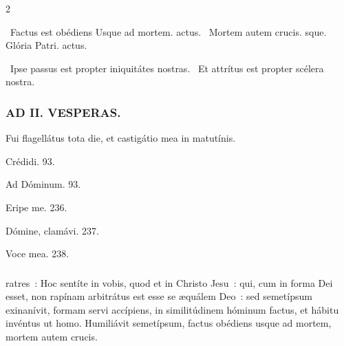 \documentclass[9pt,twoside]{extarticle}
\begin{document}
\begin{multicols}{2}
{\begin{tightlist}{}
\item {}~Factus est obédiens \textred{*} Usque ad mortem. actus. ~Mortem autem crucis. sque. Glória Patri. actus.
\item {}~Ipse passus est propter iniquitátes nostras. ~Et attrítus est propter scélera nostra.
\end{tightlist}

\subsubsection*{\center \textsc{AD II. VESPERAS.}}
\begin{tightlist}{}
\item {} Fui flagellátus tota die, et castigátio mea in matutínis.
\item {} Crédidi. 93. 
\item {} Ad Dóminum. 93. 
\item {} Eripe me. 236. 
\item {} Dómine, clamávi. 237. 
\item {} Voce mea. 238.
\end{tightlist}

\subsubsection*{}
ratres~: Hoc sentíte in vobis, quod et in Christo Jesu~: qui, cum in forma Dei esset, non rapínam arbitrátus est esse se æquálem Deo~: sed semetípsum exinanívit, formam servi accípiens, in similitúdinem hóminum factus, et hábitu invéntus ut homo. Humiliávit semetípsum, factus obédiens usque ad mortem, mortem autem crucis.

}
\end{multicols}
\end{document}
